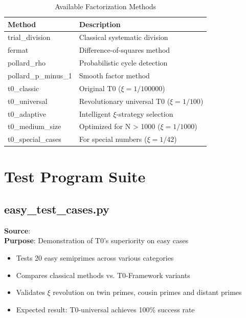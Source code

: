 	\begin{table}[H]
		\centering
		\caption{Available Factorization Methods}
		\begin{tabular}{ll}
			\toprule
			\textbf{Method} & \textbf{Description} \\
			\midrule
			trial\_division & Classical systematic division \\
			fermat & Difference-of-squares method \\
			pollard\_rho & Probabilistic cycle detection \\
			pollard\_p\_minus\_1 & Smooth factor method \\
			t0\_classic & Original T0 ($\xi = 1/100000$) \\
			t0\_universal & Revolutionary universal T0 ($\xi = 1/100$) \\
			t0\_adaptive & Intelligent $\xi$-strategy selection \\
			t0\_medium\_size & Optimized for N > 1000 ($\xi = 1/1000$) \\
			t0\_special\_cases & For special numbers ($\xi = 1/42$) \\
			\bottomrule
		\end{tabular}
	\end{table}
	
	\section{Test Program Suite}
	
	\subsection{easy\_test\_cases.py}
	\textbf{Source}: \\
	\textbf{Purpose}: Demonstration of T0's superiority on easy cases
	\begin{itemize}
		\item Tests 20 easy semiprimes across various categories
		\item Compares classical methods vs. T0-Framework variants
		\item Validates $\xi$ revolution on twin primes, cousin primes and distant primes
		\item Expected result: T0-universal achieves 100\% success rate
	\end{itemize}
	
